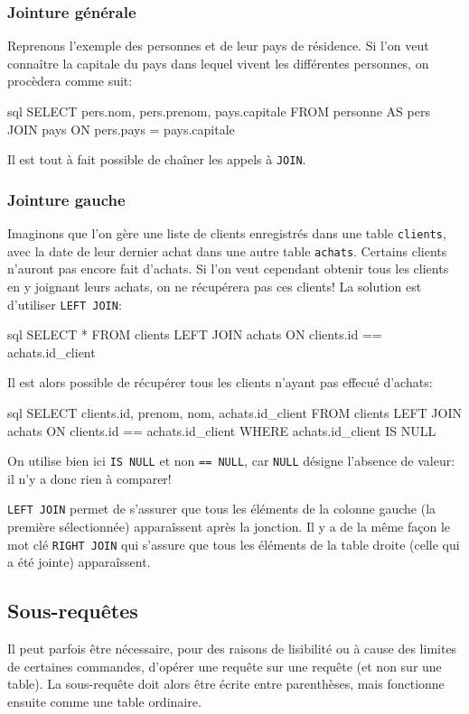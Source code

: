 \documentclass[a4paper]{scrartcl}
\begin{document}
			\subsubsection{Jointure générale}
				\semidef Reprenons l'exemple des personnes et de leur pays de résidence.
				Si l'on veut connaître la capitale du pays dans lequel vivent les différentes personnes, on procèdera comme suit:
				\begin{code}{sql}
					SELECT pers.nom, pers.prenom, pays.capitale
					FROM personne AS pers
					JOIN pays
					ON pers.pays = pays.capitale
				\end{code}

				\rem Il est tout à fait possible de chaîner les appels à \texttt{JOIN}.

			\subsubsection{Jointure gauche}
				\semidef Imaginons que l'on gère une liste de clients enregistrés dans une table \texttt{clients}, 
				avec la date de leur dernier achat dans une autre table \texttt{achats}.
				Certains clients n'auront pas encore fait d'achats. 
				Si l'on veut cependant obtenir tous les clients en y joignant leurs achats, on ne récupérera pas ces clients!
				La solution est d'utiliser \texttt{LEFT JOIN}:
				\begin{code}{sql}
					SELECT *
					FROM clients
					LEFT JOIN achats ON clients.id == achats.id_client
				\end{code}

				Il est alors possible de récupérer tous les clients n'ayant pas effecué d'achats:
				\begin{code}{sql}
					SELECT clients.id, prenom, nom, achats.id_client
					FROM clients
					LEFT JOIN achats ON clients.id == achats.id_client
					WHERE achats.id_client IS NULL
				\end{code}

				\rem On utilise bien ici \texttt{IS NULL} et non \texttt{== NULL}, car \texttt{NULL} désigne l'absence de valeur: il n'y a donc rien à comparer!

				\rem \texttt{LEFT JOIN} permet de s'assurer que tous les éléments de la colonne gauche (la première sélectionnée) 
				apparaîssent après la jonction. Il y a de la même façon le mot clé \texttt{RIGHT JOIN} qui s'assure que
				tous les éléments de la table droite (celle qui a été jointe) apparaîssent.
		
		\subsection{Sous-requêtes}
			Il peut parfois être nécessaire, pour des raisons de lisibilité ou à cause des limites de certaines commandes, 
			d'opérer une requête sur une requête (et non sur une table). La sous-requête doit alors être écrite entre parenthèses,
			mais fonctionne ensuite comme une table ordinaire.
			
\end{document}
